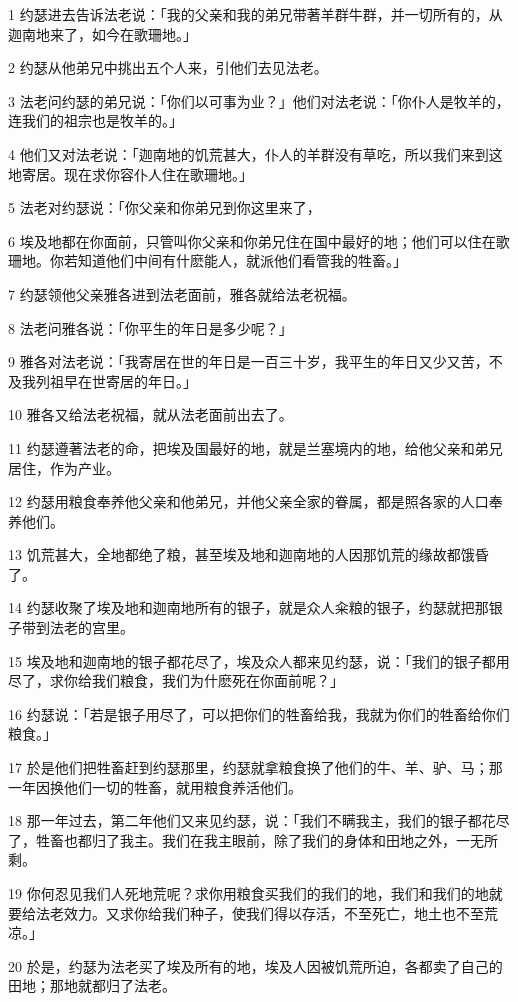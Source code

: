 \par 1 约瑟进去告诉法老说：「我的父亲和我的弟兄带著羊群牛群，并一切所有的，从迦南地来了，如今在歌珊地。」
\par 2 约瑟从他弟兄中挑出五个人来，引他们去见法老。
\par 3 法老问约瑟的弟兄说：「你们以可事为业？」他们对法老说：「你仆人是牧羊的，连我们的祖宗也是牧羊的。」
\par 4 他们又对法老说：「迦南地的饥荒甚大，仆人的羊群没有草吃，所以我们来到这地寄居。现在求你容仆人住在歌珊地。」
\par 5 法老对约瑟说：「你父亲和你弟兄到你这里来了，
\par 6 埃及地都在你面前，只管叫你父亲和你弟兄住在国中最好的地；他们可以住在歌珊地。你若知道他们中间有什麽能人，就派他们看管我的牲畜。」
\par 7 约瑟领他父亲雅各进到法老面前，雅各就给法老祝福。
\par 8 法老问雅各说：「你平生的年日是多少呢？」
\par 9 雅各对法老说：「我寄居在世的年日是一百三十岁，我平生的年日又少又苦，不及我列祖早在世寄居的年日。」
\par 10 雅各又给法老祝福，就从法老面前出去了。
\par 11 约瑟遵著法老的命，把埃及国最好的地，就是兰塞境内的地，给他父亲和弟兄居住，作为产业。
\par 12 约瑟用粮食奉养他父亲和他弟兄，并他父亲全家的眷属，都是照各家的人口奉养他们。
\par 13 饥荒甚大，全地都绝了粮，甚至埃及地和迦南地的人因那饥荒的缘故都饿昏了。
\par 14 约瑟收聚了埃及地和迦南地所有的银子，就是众人籴粮的银子，约瑟就把那银子带到法老的宫里。
\par 15 埃及地和迦南地的银子都花尽了，埃及众人都来见约瑟，说：「我们的银子都用尽了，求你给我们粮食，我们为什麽死在你面前呢？」
\par 16 约瑟说：「若是银子用尽了，可以把你们的牲畜给我，我就为你们的牲畜给你们粮食。」
\par 17 於是他们把牲畜赶到约瑟那里，约瑟就拿粮食换了他们的牛、羊、驴、马；那一年因换他们一切的牲畜，就用粮食养活他们。
\par 18 那一年过去，第二年他们又来见约瑟，说：「我们不瞒我主，我们的银子都花尽了，牲畜也都归了我主。我们在我主眼前，除了我们的身体和田地之外，一无所剩。
\par 19 你何忍见我们人死地荒呢？求你用粮食买我们的我们的地，我们和我们的地就要给法老效力。又求你给我们种子，使我们得以存活，不至死亡，地土也不至荒凉。」
\par 20 於是，约瑟为法老买了埃及所有的地，埃及人因被饥荒所迫，各都卖了自己的田地；那地就都归了法老。
